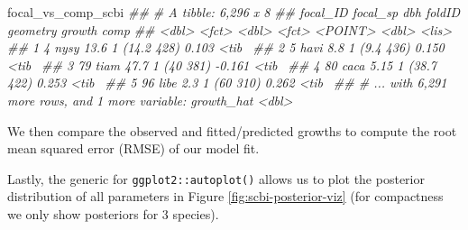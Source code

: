 \documentclass[12pt]{article}
\newenvironment{Shaded}{\begin{snugshade}}{\end{snugshade}}
\newcommand{\CommentTok}[1]{\textcolor[rgb]{0.56,0.35,0.01}{\textit{#1}}}
\newcommand{\DataTypeTok}[1]{\textcolor[rgb]{0.13,0.29,0.53}{#1}}
\newcommand{\KeywordTok}[1]{\textcolor[rgb]{0.13,0.29,0.53}{\textbf{#1}}}
\newcommand{\NormalTok}[1]{#1}
\newcommand{\OperatorTok}[1]{\textcolor[rgb]{0.81,0.36,0.00}{\textbf{#1}}}
\newcommand{\StringTok}[1]{\textcolor[rgb]{0.31,0.60,0.02}{#1}}
\begin{document}
\begin{Shaded}
\end{Shaded}

\begin{Shaded}
\begin{Highlighting}[]
\NormalTok{focal_vs_comp_scbi}
\CommentTok{## # A tibble: 6,296 x 8}
\CommentTok{##   focal_ID focal_sp   dbh foldID                  geometry growth comp }
\CommentTok{##      <dbl> <fct>    <dbl> <fct>                    <POINT>  <dbl> <lis>}
\CommentTok{## 1        4 nysy     13.6  1                     (14.2 428)  0.103 <tib~}
\CommentTok{## 2        5 havi      8.8  1                      (9.4 436)  0.150 <tib~}
\CommentTok{## 3       79 tiam     47.7  1                       (40 381) -0.161 <tib~}
\CommentTok{## 4       80 caca      5.15 1                     (38.7 422)  0.253 <tib~}
\CommentTok{## 5       96 libe      2.3  1                       (60 310)  0.262 <tib~}
\CommentTok{## # ... with 6,291 more rows, and 1 more variable: growth_hat <dbl>}
\end{Highlighting}
\end{Shaded}

We then compare the observed and fitted/predicted growths to compute the
root mean squared error (RMSE) of our model fit.

\begin{Shaded}
\end{Shaded}

Lastly, the generic for \texttt{ggplot2::autoplot()} allows us to plot
the posterior distribution of all parameters in Figure
\ref{fig:scbi-posterior-viz} (for compactness we only show posteriors
for 3 species).
\end{document}
